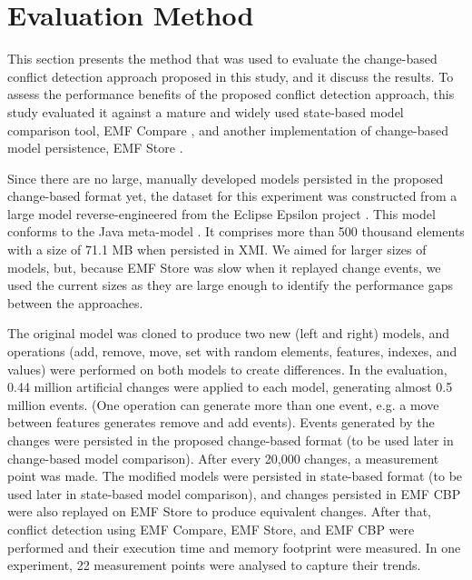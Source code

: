 \section{Evaluation Method}
\label{sec:evaluation_method}
This section presents the method that was used to evaluate the change-based conflict detection approach proposed in this study, and it discuss the results. To assess the performance benefits of the proposed conflict detection approach, this study evaluated it against a mature and widely used state-based model comparison tool, EMF Compare \cite{emfcompare2018developer,eclipse2017compare}, and another implementation of change-based model persistence, EMF Store \cite{koegel2010emfstore}.

Since there are no large, manually developed models persisted in the proposed change-based format yet, the dataset for this experiment was constructed from a large model reverse-engineered from the Eclipse Epsilon project \cite{eclipse2018epsilongit, eclipse2017epsilon}. This model conforms to the Java meta-model \cite{eclipse2018modiscojava}. It comprises more than 500 thousand elements with a size of 71.1 MB when persisted in XMI. We aimed for larger sizes of models, but, because EMF Store was slow when it replayed change events, we used the current sizes as they are large enough to identify the performance gaps between the approaches.

The original model was cloned to produce two new (left and right) models, and operations (\textsf{add}, \textsf{remove}, \textsf{move}, \textsf{set} with random elements, features, indexes, and values) were performed on both models to create differences. In the evaluation, 0.44 million artificial changes were applied to each model, generating almost 0.5 million events. (One operation can generate more than one event, e.g. a \textsf{move} between features generates \textsf{remove} and \textsf{add} events). Events generated by the changes were persisted in the proposed change-based format (to be used later in change-based model comparison). After every 20,000 changes, a measurement point was made. The modified models were persisted in state-based format (to be used later in state-based model comparison), and changes persisted in EMF CBP were also replayed on EMF Store to produce equivalent changes. After that, conflict detection using EMF Compare, EMF Store, and EMF CBP were performed and their execution time and memory footprint were measured. In one experiment, 22 measurement points were analysed to capture their trends.

